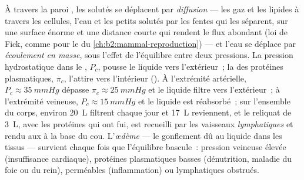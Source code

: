 \begin{proposition}\label{prop:b2:blood-circulation:exchange}
À travers la paroi , les solutés se déplacent par
\emph{diffusion} --- les gaz et les lipides à travers les cellules,
l'eau et les petits solutés par les fentes qui les séparent, sur une
surface énorme et une distance courte qui rendent le flux abondant (loi
de Fick, comme pour le  du \cref{ch:b2:mammal-reproduction}) ---
et l'eau se déplace par \emph{écoulement en masse}, sous l'effet de
l'équilibre entre deux pressions. La pression hydrostatique dans le
, $P_c$, pousse le liquide vers l'extérieur~; la  des protéines plasmatiques, $\pi_c$, l'attire vers
l'intérieur (\emph{}). À l'extrémité artérielle,
$P_c \approx
\qty{35}{mmHg}$ dépasse $\pi_c \approx \qty{25}{mmHg}$ et le liquide
filtre vers l'extérieur~; à l'extrémité veineuse,
$P_c \approx \qty{15}{mmHg}$ et le liquide est réabsorbé~; sur l'ensemble du corps,
environ \qty{20}{L} filtrent chaque jour et \qty{17}{L} reviennent, et
le reliquat de \qty{3}{L}, avec les protéines qui ont fui, est recueilli
par les vaisseaux \emph{lymphatiques} et rendu aux  à la base du
cou. L'\emph{œdème} --- le gonflement dû au liquide dans les tissus ---
survient chaque fois que l'équilibre bascule~: pression veineuse élevée
(insuffisance cardiaque), protéines plasmatiques basses (dénutrition,
maladie du foie ou du rein),  perméables (inflammation) ou
lymphatiques obstrués.
\end{proposition}

